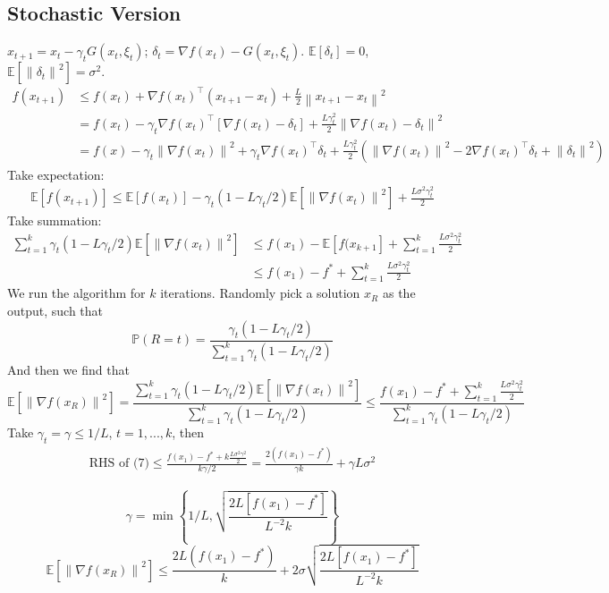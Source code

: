 \documentclass[a4paper, 11pt]{article}
\begin{document}
\subsection{Stochastic Version}
$x_{t+1} = x_t  - \gamma_t G(x_t, \xi_t)$; $\delta_t = \nabla f(x_t) - G(x_t, \xi_t)$. $\mathbb{E}\left[\delta_t\right]= 0$, $\mathbb{E}\left[\left\|\delta_t\right\|^2\right] = \sigma^2$.
\begin{equation}
  \begin{split}
      f(x_{t+1}) &\leq f(x_t) +  \nabla f(x_t)^{\top} (x_{t+1}-x_t) + \frac{L}{2}\left\|x_{t+1}-x_t\right\|^2 \\
      &=f(x_t) - \gamma_t \nabla f(x_t)^{\top}[\nabla f(x_t)-\delta_t] + \frac{L \gamma^2_t}{2} \left\|\nabla f(x_t)-\delta_t\right\|^2 \\
      &= f(x) - \gamma_t\left\|\nabla f(x_t)\right\|^2 + \gamma_t \nabla f(x_t)^{\top} \delta_t + \frac{L \gamma_t^2}{2} \left(\left\|\nabla f(x_t)\right\|^2 - 2 \nabla f(x_t)^{\top}\delta_t + \left\|\delta_t\right\|^2\right)
  \end{split}
\end{equation}
Take expectation:
\begin{equation}
  \begin{split}
    \mathbb{E}\left[f(x_{t+1})\right] \leq \mathbb{E}\left[f(x_t)\right] - \gamma_t (1- L\gamma_t/2) \mathbb{E}\left[\left\|\nabla f(x_t)\right\|^2\right] + \frac{L\sigma^2 \gamma_t^2}{2}
  \end{split}
\end{equation}
Take summation:
\begin{equation}
  \begin{split}
      \sum_{t=1}^k \gamma_t(1-L \gamma_t/2) \mathbb{E}\left[ \left\|\nabla f(x_t)\right\|^2\right] &\leq f(x_1) - \mathbb{E}\left[f(x_{k+1}\right] + \sum_{t=1}^k \frac{L\sigma^2 \gamma_t^2}{2}\\
      &\leq f(x_1) - f^* + \sum_{t=1}^k \frac{L\sigma^2 \gamma_t^2}{2}
  \end{split}
\end{equation}
We run the algorithm for $k$ iterations. Randomly pick a solution $x_R$ as the output, such that 
$$\mathbb{P}\left(R=t\right) = \frac{\gamma_t(1-L \gamma_t/2)}{\sum_{t=1}^k \gamma_t(1-L \gamma_t/2)}$$
And then we find that 
\begin{equation}
  \mathbb{E}\left[\left\|\nabla f(x_R)\right\|^2\right] = \frac{\sum_{t=1}^k \gamma_t(1-L \gamma_t/2) \mathbb{E}\left[\left\|\nabla f(x_t)\right\|^2\right]}{\sum_{t=1}^k \gamma_t(1-L \gamma_t/2)}\leq \frac{f(x_1) - f^* + \sum_{t=1}^k \frac{L\sigma^2 \gamma_t^2}{2}}{\sum_{t=1}^k \gamma_t(1-L \gamma_t/2)}
\end{equation}
Take $\gamma_t = \gamma \leq 1/L$, $t=1,...,k$, then 
\begin{equation}
  \begin{split}
    \text{RHS of (7)} \leq \frac{f(x_1) - f^* +  k\frac{L\sigma^2 \gamma^2}{2}}{k \gamma /2} = \frac{2(f(x_1)-f^*)}{\gamma k} + \gamma L \sigma^2
  \end{split}
\end{equation}

\begin{equation}
  \gamma = \min\left\{1/L, \sqrt{\frac{2L[f(x_1)-f^*]}{L^{-2}k}}\right\}
\end{equation}
\begin{equation}
   \mathbb{E}\left[\left\|\nabla f(x_R)\right\|^2\right] \leq \frac{2L(f(x_1)-f^*)}{k} + 2\sigma \sqrt{\frac{2L[f(x_1)-f^*]}{L^{-2}k}}
\end{equation}
\end{document}
